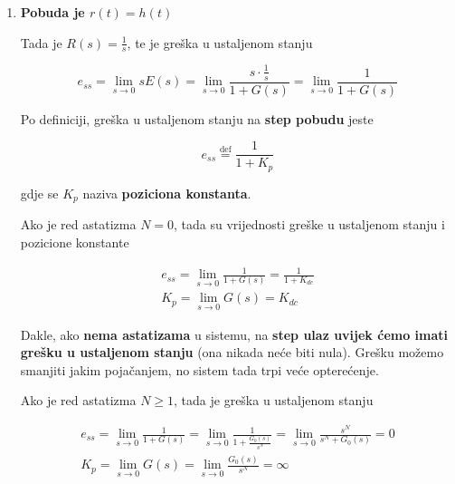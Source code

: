 \documentclass[12pt]{IEEEtran}
\numberwithin{equation}{subsection}
\numberwithin{figure}{section}
\begin{document}
\begin{enumerate}
    \item \textbf{Pobuda je $r(t) = h(t)$}

          Tada je $R(s) = \frac{1}{s}$, te je gre\v{s}ka u ustaljenom stanju

          \begin{equation}
              e_{ss} = \lim_{s \to 0}{sE(s)} = \lim_{s \to 0} \frac{s \cdot \frac{1}{s}}{1 + G(s)} = \lim_{s \to 0}{\frac{1}{1 + G(s)}}
          \end{equation}

          Po definiciji, gre\v{s}ka u ustaljenom stanju na \textbf{step pobudu} jeste

          \begin{equation}
              e_{ss} \stackrel{\text{def}}{=} \frac{1}{1 + K_{p}}
          \end{equation}

          gdje se $K_{p}$ naziva \textbf{poziciona konstanta}.

          Ako je red astatizma $N = 0$, tada su vrijednosti gre\v{s}ke 
          u ustaljenom stanju i pozicione konstante

          \begin{gather}
              e_{ss} = \lim_{s \to 0}{\frac{1}{1 + G(s)}} = \frac{1}{1 + K_{dc}}\\
              K_{p} = \lim_{s \to 0}{G(s)} = K_{dc}
          \end{gather}

          Dakle, ako \textbf{nema astatizama} u sistemu, na \textbf{step ulaz
          uvijek \'{c}emo imati gre\v{s}ku u ustaljenom stanju}
          (ona nikada ne\'{c}e biti nula). Gre\v{s}ku mo\v{z}emo
          smanjiti jakim poja\v{c}anjem, no sistem tada trpi ve\'{c}e
          optere\'{c}enje.

          \vspace{12pt}

          Ako je red astatizma $N \geq 1$, tada je gre\v{s}ka u ustaljenom stanju

          \begin{gather}
              e_{ss} = \lim_{s \to 0}{\frac{1}{1 + G(s)}} = \lim_{s \to 0}{\frac{1}{1 + \frac{G_{0}(s)}{s^{N}}}} = \lim_{s \to 0}{\frac{s^{N}}{s^{N} + G_{0}(s)}} = 0\\
              K_{p} = \lim_{s \to 0}{G(s)} = \lim_{s \to 0}{\frac{G_{0}(s)}{s^{N}}} = \infty
          \end{gather}


\end{enumerate}
\end{document}
